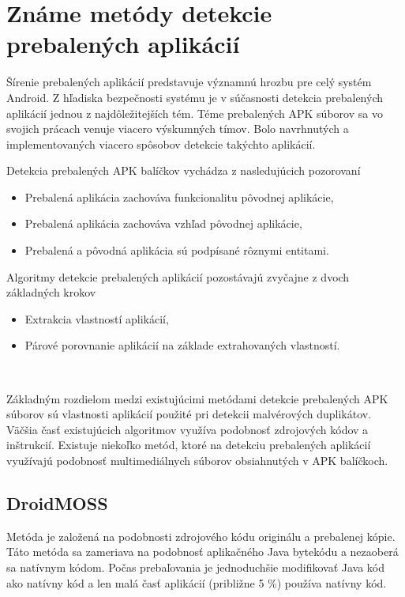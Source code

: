 \chapter{Známe metódy detekcie prebalených aplikácií}
\label{chap:zname-metody}
Šírenie prebalených aplikácií predstavuje významnú hrozbu pre celý systém Android. Z hľadiska bezpečnosti systému je v súčasnosti detekcia prebalených aplikácií jednou z najdôležitejších tém.
Téme prebalených APK súborov sa vo svojich prácach venuje viacero výskumných tímov. Bolo navrhnutých a implementovaných viacero spôsobov detekcie takýchto aplikácií. 
\newline 

\noindent Detekcia prebalených APK balíčkov vychádza z nasledujúcich pozorovaní
\begin{itemize}
	\item Prebalená aplikácia zachováva funkcionalitu pôvodnej aplikácie,
	\item Prebalená aplikácia zachováva vzhľad pôvodnej aplikácie,
	\item Prebalená a pôvodná aplikácia sú podpísané rôznymi entitami.
\end{itemize} 

\noindent Algoritmy detekcie prebalených aplikácií pozostávajú zvyčajne z dvoch základných krokov
\begin{itemize}
	\item Extrakcia vlastností aplikácií,
	\item Párové porovnanie aplikácií na základe extrahovaných vlastností.
\end{itemize}
\ \newline

\noindent Základným rozdielom medzi existujúcimi metódami detekcie prebalených APK súborov sú vlastnosti aplikácií použité pri detekcii malvérových duplikátov. Väčšia časť existujúcich algoritmov využíva podobnosť zdrojových kódov a inštrukcií. Existuje niekoľko metód, ktoré na detekciu prebalených aplikácií využívajú podobnosť multimediálnych súborov obsiahnutých v APK balíčkoch.

\section{DroidMOSS}
Metóda  je založená na podobnosti zdrojového kódu originálu a prebalenej kópie. Táto metóda sa zameriava na podobnosť aplikačného Java bytekódu a nezaoberá sa natívnym kódom. Počas prebaľovania je jednoduchšie modifikovať Java kód ako natívny kód a len malá časť aplikácií (približne 5 \%) používa natívny kód.

